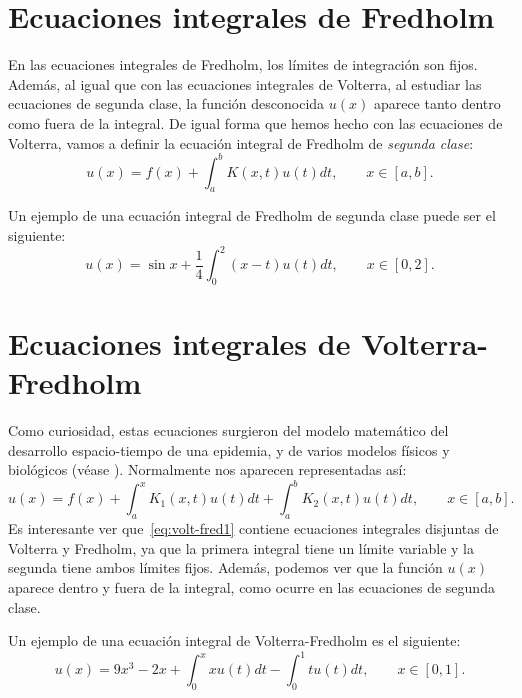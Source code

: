 \section{Ecuaciones integrales de Fredholm}
En las ecuaciones integrales de Fredholm, los límites de integración son fijos. Además, al igual que con las ecuaciones integrales de Volterra, al estudiar las ecuaciones de segunda clase, la función desconocida $u(x)$ aparece tanto dentro como fuera de la integral. De igual forma que hemos hecho con las ecuaciones de Volterra, vamos a definir la ecuación integral de Fredholm de \textit{segunda clase}:
\begin{equation}\label{}
	u(x) = f(x) + \int_a^b K(x,t)u(t)dt, \qquad x \in [a,b].
\end{equation}
\begin{ejemplo}
	Un ejemplo de una ecuación integral de Fredholm de segunda clase puede ser el siguiente:
	\begin{equation}\label{}
		u(x) = \sin x + \dfrac{1}{4}\int_{0}^2 (x-t)u(t)dt, \qquad x \in [0,2].
	\end{equation}
\end{ejemplo}

\section{Ecuaciones integrales de Volterra-Fredholm}
Como curiosidad, estas ecuaciones surgieron del modelo matemático del desarrollo espacio-tiempo de una epidemia, y de varios modelos físicos y biológicos (véase \cite{WazWaz}). Normalmente nos aparecen representadas así:
\begin{equation}\label{eq:volt-fred1}
	u(x) = f(x) + \int_a^x K_1(x,t)u(t)dt + \int_a^b K_2(x,t)u(t)dt, \qquad x \in [a,b].
\end{equation}
Es interesante ver que~\eqref{eq:volt-fred1} contiene ecuaciones integrales disjuntas de Volterra y Fredholm, ya que la primera integral tiene un límite variable y la segunda tiene ambos límites fijos. Además, podemos ver que la función $u(x)$ aparece dentro y fuera de la integral, como ocurre en las ecuaciones de segunda clase.
\begin{ejemplo}
	Un ejemplo de una ecuación integral de Volterra-Fredholm es el siguiente:
	\begin{equation}\label{}
		u(x) = 9x^3 - 2x + \int_0^x xu(t)dt - \int_{0}^1 tu(t)dt, \qquad x \in [0,1].
	\end{equation}
\end{ejemplo}

\endinput